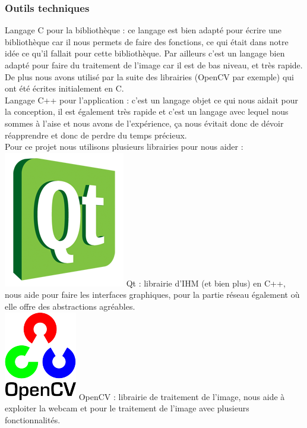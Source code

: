 \documentclass{report}
\begin{document}
			\subsubsection{Outils techniques}
			
			Langage C pour la bibliothèque : ce langage est bien adapté pour écrire une bibliothèque car il nous permets de faire des fonctions, ce qui était dans notre idée ce qu'il fallait pour cette bibliothèque. Par ailleurs c'est un langage bien adapté pour faire du traitement de l'image car il est de bas niveau, et très rapide. De plus nous avons utilisé par la suite des librairies (OpenCV par exemple) qui ont été écrites initialement en C. \\
			Langage C++ pour l'application : c'est un langage objet ce qui nous aidait pour la conception, il est également très rapide et c'est un langage avec lequel nous sommes à l'aise et nous avons de l'expérience, ça nous évitait donc de dévoir réapprendre et donc de perdre du temps précieux.\\
			
			Pour ce projet nous utilisons plusieurs librairies pour nous aider : \\
			
			\includegraphics[scale=0.15]{../logos/qt_logo.png}
			Qt : librairie d'IHM (et bien plus) en C++, nous aide pour faire les interfaces graphiques, pour la partie réseau également où elle offre des abstractions agréables. \\
			
			\includegraphics[scale=1]{../logos/OpenCV_Logo.png}
			OpenCV : librairie de traitement de l'image, nous aide à exploiter la webcam et pour le traitement de l'image avec plusieurs fonctionnalités. \\
		
\end{document}
